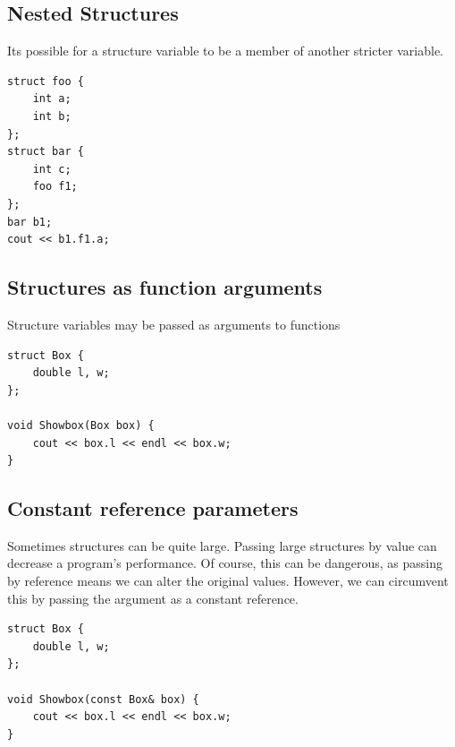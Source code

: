 \documentclass{report}
\begin{document}
	\pagebreak \bigbreak \noindent 
	\subsection{Nested Structures}
	\bigbreak \noindent 
	Its possible for a structure variable to be a member of another stricter variable.
	\bigbreak \noindent 
	\sepline
	\begin{verbatim}
struct foo {
    int a;
    int b;
};
struct bar {
    int c;
    foo f1;
};
bar b1;
cout << b1.f1.a;
	\end{verbatim}
	\sepline

	\bigbreak \noindent 
	\subsection{Structures as function arguments}
	\bigbreak \noindent 
	\begin{concept}
	   Structure variables may be passed as arguments to functions 
	\end{concept}
	\bigbreak \noindent 
	\sepline
	\begin{verbatim}
struct Box {
    double l, w;
};

void Showbox(Box box) {
    cout << box.l << endl << box.w;
}
	\end{verbatim}
	\sepline
	
	\bigbreak \noindent 
	\bigbreak \noindent 

	\pagebreak \bigbreak \noindent 
	\subsection{Constant reference parameters}
	\bigbreak \noindent 
	\begin{concept}
	   Sometimes structures can be quite large. Passing large structures by value can decrease a program's performance. Of course, this can be dangerous, as passing by reference means we can alter the original values. However, we can circumvent this by passing the argument as a constant reference.
	\end{concept}
	\bigbreak \noindent 
	\sepline
	\begin{verbatim}
struct Box {
    double l, w;
};

void Showbox(const Box& box) {
    cout << box.l << endl << box.w;
}
	\end{verbatim}
	\sepline

	\bigbreak \noindent 
\end{document}
